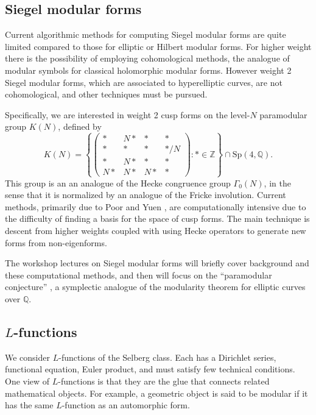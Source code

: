 \documentclass[12pt]{amsart}
\numberwithin{equation}{section}
\newcommand{\Q}{\mathbb Q}
\newcommand{\Z}{\mathbb Z}
\begin{document}
\subsection{Siegel modular forms}

Current algorithmic methods for computing Siegel modular forms are
quite limited compared to those for elliptic or Hilbert modular forms.
For higher weight there is the possibility of employing cohomological
methods, the analogue of modular symbols for classical holomorphic
modular forms.  However weight 2 Siegel modular forms, which are associated to
hyperelliptic curves, are not cohomological, and other techniques must
be pursued.  

Specifically, we are interested in weight 2 cusp forms on the
level-$N$ paramodular group $K (N)$, defined by
$$
K(N)=\left\{
\left(\begin{matrix}
  * & N* & * &*\\
* & * & * & */N\\
* & N* &*&*\\
N*&N*&N*&*
\end{matrix}\right)
:
*\in{\Z}\right\}\cap \mathrm{Sp}(4, \Q).
$$
This group is an an analogue of the Hecke congruence group
$\Gamma_0(N)$, in the sense that it is normalized by an analogue of
the Fricke involution.  Current methods, primarily due to Poor and
Yuen \cite{poory, PY_para_p}, are computationally intensive due to the
difficulty of finding a basis for the space of cusp forms.  The main
technique is descent from higher weights coupled with using Hecke
operators to generate new forms from non-eigenforms. 

The workshop lectures on Siegel modular forms will briefly cover
background and these computational methods, and then will focus on the
``paramodular conjecture'' \cite{BrumerKramer}, a symplectic analogue
of the modularity theorem for elliptic curves over $\Q$.


\subsection{$L$-functions}

We consider $L$-functions of the Selberg class.
Each has a Dirichlet series, functional equation, 
Euler product, and must satisfy few technical conditions.  One view of
$L$-functions is that they are the glue that connects related
mathematical objects.  For example, a geometric object is said to be
modular if it has the same $L$-function as an automorphic form.
\end{document}
